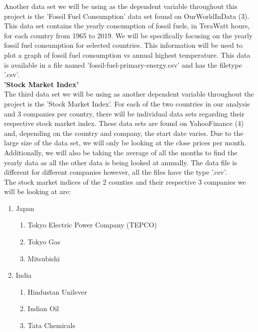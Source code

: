 \documentclass[fontsize=11pt]{article}
\begin{document}
Another data set we will be using as the dependent variable throughout
this project is the 'Fossil Fuel Consumption' data set found on OurWorldInData (3). This data set contains the yearly consumption of fossil fuels, in TeraWatt hours, for each country from 1965 to 2019. We will be specifically focusing on the yearly fossil fuel consumption for selected countries. This information will be used to plot a graph of fossil fuel consumption vs annual highest temperature. This data is available in a file named 'fossil-fuel-primary-energy.csv' and has the filetype '.csv'.\\

\noindent \textbf{'Stock Market Index'}\\

The third data set we will be using as another dependent variable
throughout the project is the 'Stock Market Index'. For each of the two
countries in our analysis and 3 companies per country, there will be individual data sets regarding their respective stock market index. These data sets are found on YahooFinance (4) and, depending on the country and company, the start date varies. Due to the large size of the data set, we will only be looking at the close prices per month. Additionally, we will also be taking the average of all the months to find the yearly data as
all the other data is being looked at annually. The data file is
different for different companies however, all the files have the type
'.csv'. \\

\noindent The stock market indices of the 2 counties and their respective 3 companies we will be looking at are:
\begin{enumerate}
    \item Japan
        \begin{enumerate}
            \item Tokyo Electric Power Company (TEPCO)
            \item Tokyo Gas
            \item Mitsubishi
        \end{enumerate}
    \item India
        \begin{enumerate}
            \item Hindustan Unilever
            \item Indian Oil
            \item Tata Chemicals
        \end{enumerate}
\end{enumerate}\\
\end{document}
